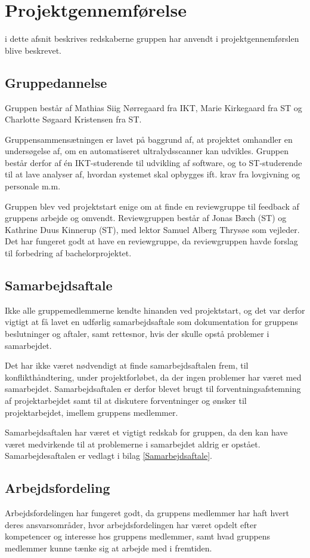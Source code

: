 \chapter{Projektgennemførelse}\label{kapitel_Projektgennemforelse}
i dette afsnit beskrives redskaberne gruppen har anvendt i projektgennemførslen blive beskrevet. 

\section{Gruppedannelse}
Gruppen består af Mathias Siig Nørregaard fra IKT, Marie Kirkegaard fra ST og Charlotte Søgaard Kristensen fra ST. 

Gruppensammensætningen er lavet på baggrund af, at projektet omhandler en undersøgelse af, om en automatiseret ultralydsscanner kan udvikles. Gruppen består derfor af én IKT-studerende til udvikling af software, og to ST-studerende til at lave analyser af, hvordan systemet skal opbygges ift. krav fra lovgivning og personale m.m. 

Gruppen blev ved projektstart enige om at finde en reviewgruppe til feedback af gruppens arbejde og omvendt. Reviewgruppen består af Jonas Bæch (ST) og Kathrine Duus Kinnerup (ST), med lektor Samuel Alberg Thrysøe som vejleder. Det har fungeret godt at have en reviewgruppe, da reviewgruppen havde forslag til forbedring af bachelorprojektet.  

\section{Samarbejdsaftale}
Ikke alle gruppemedlemmerne kendte hinanden ved projektstart, og det var derfor vigtigt at få lavet en udførlig samarbejdsaftale som dokumentation for gruppens beslutninger og aftaler, samt rettesnor, hvis der skulle opstå problemer i samarbejdet. 

Det har ikke været nødvendigt at finde samarbejdsaftalen frem, til konflikthåndtering, under projektforløbet, da der ingen problemer har været med samarbejdet. Samarbejdsaftalen er derfor blevet brugt til forventningsafstemning af projektarbejdet samt til at diskutere forventninger og ønsker til projektarbejdet, imellem gruppens medlemmer. 

Samarbejdsaftalen har været et vigtigt redskab for gruppen, da den kan have været medvirkende til at problemerne i samarbejdet aldrig er opstået. Samarbejdesaftalen er vedlagt i bilag \ref{Samarbejdsaftale}. 

\section{Arbejdsfordeling}
Arbejdsfordelingen har fungeret godt, da gruppens medlemmer har haft hvert deres ansvarsområder, hvor arbejdsfordelingen har været opdelt efter kompetencer og interesse hos gruppens medlemmer, samt hvad gruppens medlemmer kunne tænke sig at arbejde med i fremtiden.  

